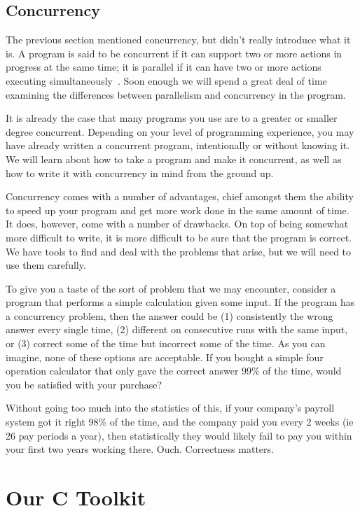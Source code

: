 \subsection*{Concurrency}

The previous section mentioned concurrency, but didn't really introduce what it is. A program is said to be concurrent if it can support two or more actions in progress at the same time; it is parallel if it can have two or more actions executing simultaneously~\cite{artofc}. Soon enough we will spend a great deal of time examining the differences between parallelism and concurrency in the program.

It is already the case that many programs you use are to a greater or smaller degree concurrent. Depending on your level of programming experience, you may have already written a concurrent program, intentionally or without knowing it. We will learn about how to take a program and make it concurrent, as well as how to write it with concurrency in mind from the ground up.

Concurrency comes with a number of advantages, chief amongst them the ability to speed up your program and get more work done in the same amount of time. It does, however, come with a number of drawbacks. On top of being somewhat more difficult to write, it is more difficult to be sure that the program is correct. We have tools to find and deal with the problems that arise, but we will need to use them carefully.

To give you a taste of the sort of problem that we may encounter, consider a program that performs a simple calculation given some input. If the program has a concurrency problem,  then the answer could be (1) consistently the wrong answer every single time, (2) different on consecutive runs with the same input, or (3) correct some of the time but incorrect some of the time. As you can imagine, none of these options are acceptable. If you bought a simple four operation calculator that only gave the correct answer 99\% of the time, would you be satisfied with your purchase?

Without going too much into the statistics of this, if your company's payroll system got it right 98\% of the time, and the company paid you every 2 weeks (ie 26 pay periods a year), then statistically they would likely fail to pay you  within your first two years working there. Ouch. Correctness matters.

\section*{Our C Toolkit}

